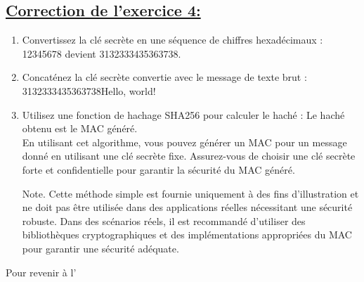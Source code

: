 \newpage
\subsection{\textbf{\underline{Correction de l'exercice 4:}}}\label{C_Exo 4}

\begin{enumerate}
    \item Convertissez la clé secrète en une séquence de chiffres hexadécimaux : 12345678 devient 3132333435363738.
    
    \item Concaténez la clé secrète convertie avec le message de texte brut : 3132333435363738Hello, world!

    \item Utilisez une fonction de hachage SHA256 pour calculer le haché : Le haché obtenu est le MAC généré.\\
    En utilisant cet algorithme, vous pouvez générer un MAC pour un message donné en utilisant une clé secrète fixe. Assurez-vous de choisir une clé secrète forte et confidentielle pour garantir la sécurité du MAC généré.
    
    \item [Note.] Cette méthode simple est fournie uniquement à des fins d'illustration et ne doit pas être utilisée dans des applications réelles nécessitant une sécurité robuste. Dans des scénarios réels, il est recommandé d'utiliser des bibliothèques cryptographiques et des implémentations appropriées du MAC pour garantir une sécurité adéquate.\\
\end{enumerate}

\par Pour revenir à l'

